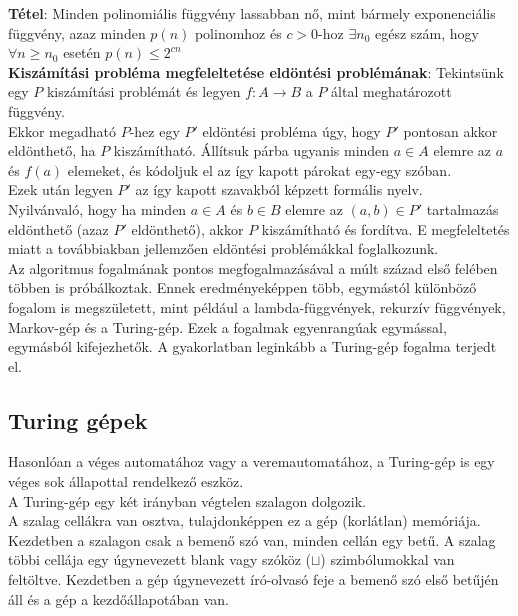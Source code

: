 \documentclass[tikz,12pt,margin=0px]{article}
\begin{document}
	\noindent \textbf{Tétel}: Minden polinomiális függvény lassabban nő, mint bármely exponenciális függvény, azaz minden $p(n)$ polinomhoz és $c>0$-hoz $\exists n_{0}$ egész szám, hogy $\forall n \geq n_{0}$ esetén $p(n) \leq 2^{cn}$\\
	
    \noindent \textbf{Kiszámítási probléma megfeleltetése eldöntési problémának}: Tekintsünk egy $P$ kiszámítási problémát és legyen $f: A \to B$ a $P$ által meghatározott függvény.\\

    \noindent Ekkor megadható $P$-hez egy $P'$ eldöntési probléma úgy, hogy $P'$ pontosan akkor eldönthető, ha $P$ kiszámítható. Állítsuk párba ugyanis minden $a \in A$ elemre az $a$ és $f(a)$ elemeket, és kódoljuk el az így kapott párokat egy-egy szóban.\\

    \noindent Ezek után legyen $P'$ az így kapott szavakból képzett formális nyelv.\\

    \noindent Nyilvánvaló, hogy ha minden $a \in A$ és $b \in B$ elemre az $(a,b) \in P'$ tartalmazás eldönthető (azaz $P'$ eldönthető), akkor $P$ kiszámítható és fordítva. E megfeleltetés miatt a továbbiakban jellemzően eldöntési problémákkal foglalkozunk.\\

    \noindent Az algoritmus fogalmának pontos megfogalmazásával a múlt század első felében többen is próbálkoztak. Ennek eredményeképpen több, egymástól különböző fogalom is megszületett, mint például a lambda-függvények, rekurzív függvények, Markov-gép és a Turing-gép. Ezek a fogalmak egyenrangúak egymással, egymásból kifejezhetők. A gyakorlatban leginkább a Turing-gép fogalma terjedt el.

    \subsection*{Turing gépek}

	\noindent Hasonlóan a véges automatához vagy a veremautomatához, a Turing-gép is egy véges sok állapottal rendelkező eszköz. \\

    \noindent A Turing-gép egy két irányban végtelen szalagon dolgozik. \\

    \noindent A szalag cellákra van osztva, tulajdonképpen ez a gép (korlátlan) memóriája. Kezdetben a szalagon csak a bemenő szó van, minden cellán egy betű. A szalag többi cellája egy úgynevezett blank vagy szóköz ($\sqcup$) szimbólumokkal van feltöltve. Kezdetben a gép úgynevezett író-olvasó feje a bemenő szó első betűjén áll és a gép a kezdőállapotában van. \\
\end{document}
